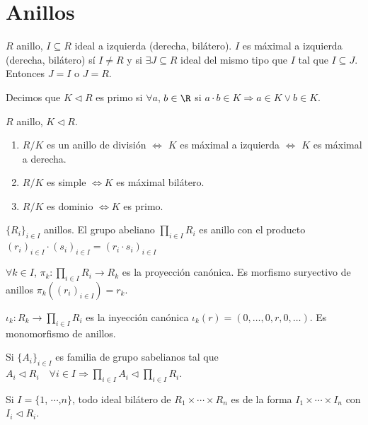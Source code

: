 \section{Anillos}

\begin{definition}
    \(R\) anillo, \(I \subseteq R\) ideal a izquierda (derecha, bilátero). \(I\) es máximal a izquierda
    (derecha, bilátero) sí \(I \neq R\) y si \(\exists J \subseteq R\) ideal del mismo tipo que \(I\) tal que \(I \subseteq J\).
    Entonces \(J = I\) o \(J = R\).
\end{definition}

Decimos que \(K \triangleleft R\) es primo si \(\forall a\), \(b \in \R\) si \(a \cdot b \in K \Rightarrow a \in K \lor b \in K\).

\begin{prop}
    \(R\) anillo, \(K \triangleleft R\). \begin{enumerate}
        \item \(R/K\) es un anillo de división \(\iff\) \(K\) es máximal a izquierda \(\iff\) \(K\) es máximal a derecha.
        \item \(R/K\) es simple \(\iff K\) es máximal bilátero.
        \item \(R/K\) es dominio \(\iff K\) es primo.
    \end{enumerate}
\end{prop}

\begin{definition}
    \(\{ R_i \}_{i \in I}\) anillos. El grupo abeliano \(\prod_{i \in I} R_i\) es anillo con el producto \((r_i)_{i \in I} \cdot (s_i)_{i \in I} = (r_i \cdot s_i)_{i \in I}\)
\end{definition}

\(\forall k \in I\), \(\pi_k : \prod_{i \in I} R_i \to R_k\) es la proyección canónica. Es morfismo suryectivo de anillos \(\pi_k((r_i)_{i \in I}) = r_k\).

\(\iota_k : R_k \to \prod_{i \in I} R_i\) es la inyección canónica \(\iota_k(r) = (0, \ldots, 0, r, 0, \ldots)\). Es monomorfismo de anillos.

Si \(\{ A_i \}_{i \in I}\) es familia de grupo sabelianos tal que \(A_i \triangleleft R_i \quad \forall i \in I \Rightarrow \prod_{i \in I} A_i \triangleleft \prod_{i \in I} R_i\).

Si \(I = \{ 1 \), \(\cdots\),\( n\}\), todo ideal bilátero de \(R_1 \times \cdots \times R_n\) es de la forma \(I_1 \times \cdots \times I_n\) con \(I_i \triangleleft R_i\).

